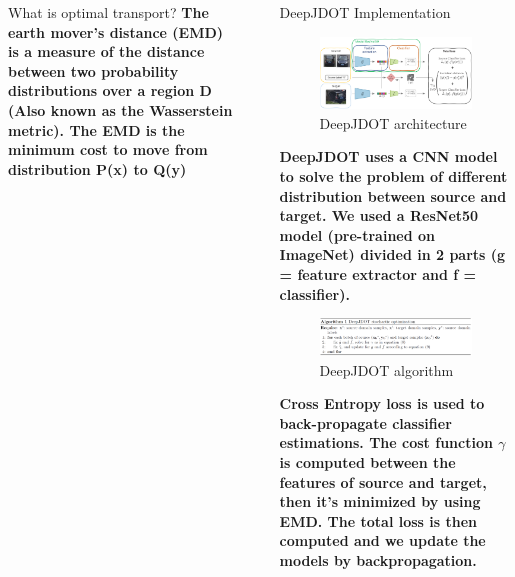 \documentclass[final]{beamer}
\newlength{\sepwid}
\newlength{\onecolwid}
\begin{document}
\begin{frame}[t]
\begin{columns}[t]
\begin{column}{\onecolwid}
\begin{block}{What is optimal transport?}
\textbf{The earth mover's distance (EMD) is a measure of the distance between two probability distributions over a region D (Also known as the Wasserstein metric). The EMD is the minimum cost to move from distribution P(x) to Q(y)}
\end{block}

\end{column} %
\begin{column}{\sepwid}\end{column} %
\begin{column}{\onecolwid} %
\vspace{1em}
 \begin{block}{DeepJDOT Implementation}

\begin{figure}
    \vspace*{0.2cm}
    \includegraphics[width=1\linewidth]{images/jdotnet.PNG}
    \caption{DeepJDOT architecture}
\end{figure}
 
 \textbf{DeepJDOT uses a CNN model to solve the problem of different distribution between source and target. We used a ResNet50 model (pre-trained on ImageNet) divided in 2 parts (g = feature extractor and f = classifier).\\ }
 
\begin{figure}
    \vspace*{1cm}
    \includegraphics[width=1\linewidth]{images/jdotalgo.PNG}
    \caption{DeepJDOT algorithm}
\end{figure}
\textbf{Cross Entropy loss is used to back-propagate classifier estimations. The cost function $\gamma$ is computed between the features of source and target, then it's minimized by using EMD. The total loss is then computed and we update the models by backpropagation.}
 

\end{block}
\end{column}
\end{columns}
\end{frame}
\end{document}
